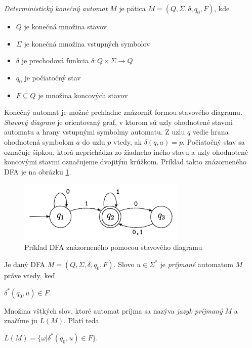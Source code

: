 \begin{definice}
\textit{Deterministický konečný automat} $M$ je pätica $M = (Q,\Sigma,\delta, q_0, F)$, kde
\begin{itemize}
\item $Q$ je konečná množina stavov
\item $\Sigma$ je konečná množina vstupných symbolov
\item $\delta$ je prechodová funkcia $\delta: Q \times \Sigma \rightarrow Q$
\item $q_0$ je počiatočný stav
\item $F \subseteq Q$ je množina koncových stavov \cite{demlova:automaty}
\end{itemize}
\end{definice}

Konečný automat je možné prehľadne znázorniť formou stavového diagramu. \textit{Stavový diagram} je orientovaný graf, v ktorom sú uzly ohodnotené stavmi automatu a hrany vstupnými symbolmy automatu. Z uzlu $q$ vedie hrana ohodnotená symbolom $a$ do uzlu $p$ vtedy, ak $\delta(q,a) = p$. Počiatočný stav sa označuje šipkou, ktorá neprichádza zo žiadneho iného stavu a uzly ohodnotené koncovými stavmi označujeme dvojitým krúžkom. Príklad takto znázorneného DFA je na obrázku \ref{fig:DFA_example}.

\begin{figure}[H]
\begin{center}
\includegraphics[width=8cm]{figures/DFA_example.PNG}
\caption{Príklad DFA znázorneného pomocou stavového diagramu}
\label{fig:DFA_example}
\end{center}
\end{figure}

\begin{definice}\label{def:regular_language}
Je daný DFA $M = (Q,\Sigma,\delta, q_0, F)$. Slovo $u \in \Sigma^*$ je \textit{príjmané} automatom $M$ práve vtedy, keď
\begin{center}
$\delta^*(q_0,u) \in F$.
\end{center}
Množina vštkých slov, ktoré automat príjma sa nazýva \textit{jazyk príjmaný} $M$ a značíme ju $L(M)$. Platí teda
\begin{center}
$L(M) = \{\omega|\delta^*(q_0,u) \in F\}$.\cite{demlova:automaty}
\end{center}
\end{definice}

